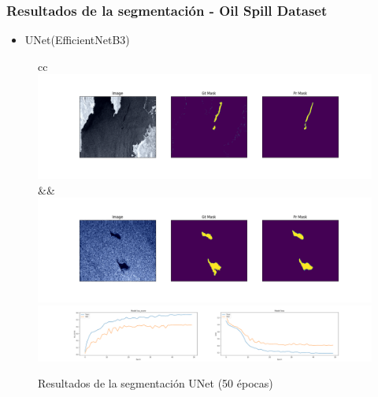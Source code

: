\begin{frame}
\frametitle{Resultados de la segmentación - Oil Spill Dataset}
\begin{itemize}
    \item UNet(EfficientNetB3)
\end{itemize}    

\begin{figure}
    \centering
    \begin{tabular}{cc}
         \includegraphics[scale=0.15]{img/section_06/unet50/efficientnetb3_resultado77.png}&&
         \includegraphics[scale=0.15]{img/section_06/unet50/efficientnetb3_resultado98.png}\\
         \includegraphics[scale=0.12]{img/section_06/unet50/efficientnetb3_training_results.png}
    \end{tabular}
    \caption{Resultados de la segmentación UNet (50 épocas)}
    \label{fig:my_label}
\end{figure}
\end{frame}

